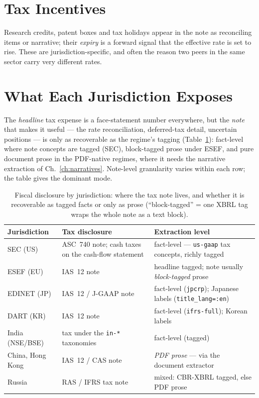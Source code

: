 \documentclass[11pt,a4paper]{report}
\begin{document}
\section{Tax Incentives}
Research credits, patent boxes and tax holidays appear in the note as reconciling items or narrative; their
\emph{expiry} is a forward signal that the effective rate is set to rise. These are jurisdiction-specific, and
often the reason two peers in the same sector carry very different rates.

\section{What Each Jurisdiction Exposes}
The \emph{headline} tax expense is a face-statement number everywhere, but the \emph{note} that makes it
useful --- the rate reconciliation, deferred-tax detail, uncertain positions --- is only as recoverable as the
regime's tagging (Table~\ref{tab:fiscal-jurisdictions}): fact-level where note concepts are tagged (SEC),
block-tagged prose under ESEF, and pure document prose in the PDF-native regimes, where it needs the narrative
extraction of Ch.~\ref{ch:narratives}. Note-level granularity varies within each row; the table gives the
dominant mode.

\begin{table}[h]
\centering
\small
\caption{Fiscal disclosure by jurisdiction: where the tax note lives, and whether it is recoverable as tagged
facts or only as prose (``block-tagged'' = one XBRL tag wraps the whole note as a text block).}
\label{tab:fiscal-jurisdictions}
\begin{tabular}{@{}p{}p{}p{}@{}}
\toprule
\textbf{Jurisdiction} & \textbf{Tax disclosure} & \textbf{Extraction level} \\
\midrule
SEC (US) & ASC~740 note; cash taxes on the cash-flow statement & fact-level --- \texttt{us-gaap} tax concepts, richly tagged \\
ESEF (EU) & IAS~12 note & headline tagged; note usually \emph{block-tagged} prose \\
EDINET (JP) & IAS~12 / J-GAAP note & fact-level (\texttt{jpcrp}); Japanese labels (\texttt{title\_lang=:en}) \\
DART (KR) & IAS~12 note & fact-level (\texttt{ifrs-full}); Korean labels \\
India (NSE/BSE) & tax under the \texttt{in-*} taxonomies & fact-level (tagged) \\
China, Hong Kong & IAS~12 / CAS note & \emph{PDF prose} --- via the document extractor \\
Russia & RAS / IFRS tax note & mixed: CBR-XBRL tagged, else PDF prose \\
\bottomrule
\end{tabular}
\end{table}
\end{document}
